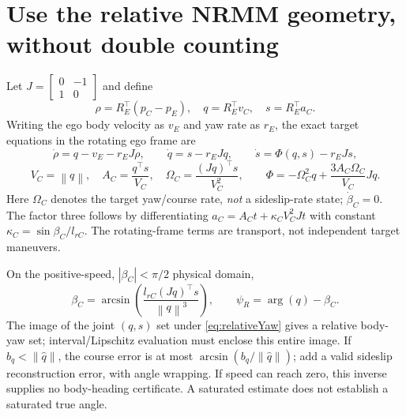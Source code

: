 \documentclass[10pt,letterpaper]{article}
\newcommand{\norm}[1]{\left\lVert#1\right\rVert}
\begin{document}
\section{Use the relative NRMM geometry, without double counting}
Let $J=\left[\begin{smallmatrix}0&-1\\1&0\end{smallmatrix}\right]$ and define
\begin{equation}
\rho=R_E^\top(p_C-p_E),\quad q=R_E^\top v_C,\quad s=R_E^\top a_C.
\end{equation}
Writing the ego body velocity as $v_E$ and yaw rate as $r_E$, the exact target
equations in the rotating ego frame are
\begin{equation}\label{eq:nrmm}
\dot\rho=q-v_E-r_EJ\rho,\qquad
\dot q=s-r_EJq,\qquad \dot s=\Phi(q,s)-r_EJs,
\end{equation}
\begin{equation}\label{eq:phi}
V_C=\norm q,\quad A_C=\frac{q^\top s}{V_C},\quad
\Omega_C=\frac{(Jq)^\top s}{V_C^2},\qquad
\Phi=-\Omega_C^2q+\frac{3A_C\Omega_C}{V_C}Jq.
\end{equation}
Here $\Omega_C$ denotes the target yaw/course rate, \emph{not} a sideslip-rate
state; $\dot\beta_C=0$. The factor three follows by differentiating
$a_C=A_Ct+\kappa_CV_C^2Jt$ with constant
$\kappa_C=\sin\beta_C/l_{rC}$. The rotating-frame terms are transport, not
independent target maneuvers.

On the positive-speed, $|\beta_C|<\pi/2$ physical domain,
\begin{equation}\label{eq:relativeYaw}
\beta_C=\arcsin\!\left(\frac{l_{rC}(Jq)^\top s}{\norm q^3}\right),\qquad
\psi_R=\arg(q)-\beta_C.
\end{equation}
The image of the joint $(q,s)$ set under \eqref{eq:relativeYaw} gives a relative
body-yaw set; interval/Lipschitz evaluation must enclose this entire image. If
$b_q<\norm{\hat q}$, the course error is at most
$\arcsin(b_q/\norm{\hat q})$; add a valid sideslip reconstruction error, with
angle wrapping. If speed can reach zero, this inverse supplies no body-heading
certificate. A saturated estimate does not establish a saturated true angle.
\end{document}
